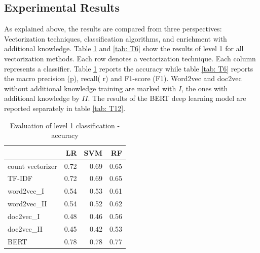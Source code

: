 \documentclass[12pt, a4paper, titlepage]{article}
\begin{document}
\subsection{Experimental Results}
As explained above, the results are compared from three perspectives: Vectorization techniques, classification algorithms, and enrichment with additional knowledge. Table \ref{tab: T5} and \ref{tab: T6} show the results of level 1 for all vectorization methods. Each row denotes a vectorization technique. Each column represents a classifier. Table \ref{tab: T5} reports the accuracy while table \ref{tab: T6} reports the macro precision (p), recall( r) and F1-score (F1). Word2vec and doc2vec without additional knowledge training are marked with $I$, the ones with additional knowledge by $II$. The results of the \ac{BERT} deep learning model are reported separately in table \ref{tab: T12}. 


\begin{table}[hb!]
  \center
\begin{tabular}{lrrr} 
  \hline
  {} &    \textbf{LR} &   \textbf{SVM} &    \textbf{RF} \\
  \hline
count vectorizer &  0.72 &  0.69 &  0.65 \\
TF-IDF           &  0.72 &  0.69 &  0.65 \\
word2vec\_I      &  0.54 &  0.53 &  0.61 \\
word2vec\_II     &  0.54 &  0.52 &  0.62 \\
doc2vec\_I       &  0.48 &  0.46 &  0.56 \\
doc2vec\_II      &  0.45 &  0.42 &  0.53 \\
BERT            &  0.78 &  0.78 &  0.77 \\
  \hline
  \end{tabular}
  \caption{\label{tab: T5} Evaluation of level 1 classification - accuracy}
\end{table}
\end{document}
